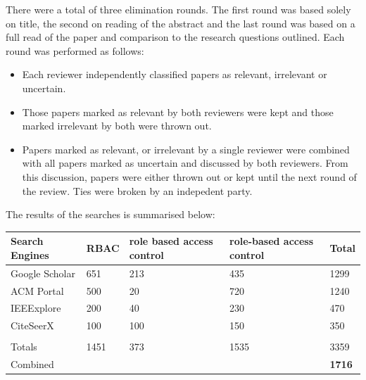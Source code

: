 \documentclass[letterpaper,10pt,english]{sphinxmanual}
\begin{document}
There were a total of three elimination rounds.  The first round was based solely on title, the second on reading of the abstract and the last round was based on a full read of the paper and comparison to the research questions outlined.  Each round was performed as follows:
\begin{itemize}
\item {} 
Each reviewer independently classified papers as relevant, irrelevant or uncertain.

\item {} 
Those papers marked as relevant by both reviewers were kept and those marked irrelevant by both were thrown out.

\item {} 
Papers marked as relevant, or irrelevant by a single reviewer were combined with all papers marked as uncertain and discussed by both reviewers.  From this discussion, papers were either thrown out or kept until the next round of the review.  Ties were broken by an indepedent party.

\end{itemize}

The results of the searches is summarised below:

\begin{tabulary}{\linewidth}{|L|L|L|L|L|}
\hline
\textbf{
Search Engines
} & \textbf{
RBAC
} & \textbf{
role based access control
} & \textbf{
role-based access control
} & \textbf{
Total
}\\\hline

Google Scholar
 & 
651
 & 
213
 & 
435
 & 
1299
\\\hline

ACM Portal
 & 
500
 & 
20
 & 
720
 & 
1240
\\\hline

IEEExplore
 & 
200
 & 
40
 & 
230
 & 
470
\\\hline

CiteSeerX
 & 
100
 & 
100
 & 
150
 & 
350
\\\hline
 &  &  &  & \\\hline

Totals
 & 
1451
 & 
373
 & 
1535
 & 
3359
\\\hline

Combined
 &  &  &  & 
\textbf{1716}
\\\hline
\end{tabulary}
\end{document}
